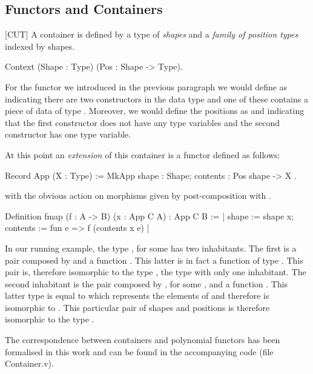 \documentclass{llncs}
\begin{document}
\subsection{Functors and Containers}
\label{sec:functors}
[CUT]
A container is defined by a type of \emph{shapes}
and a \emph{family of position types} indexed by shapes.
\begin{coqcode}
Context (Shape : Type) (Pos : Shape -> Type).
\end{coqcode}
For the functor  we introduced in the previous paragraph we would
define  as  indicating there are two constructors in
the data type and one of these contains a piece of data of type .
Moreover, we would define the positions as 
and   indicating that the first constructor does not
have any type variables and the second constructor has one type variable.

At this point an \emph{extension} of this container is a functor defined as
follows:
\begin{coqcode}
Record App (X : Type) := MkApp { shape : Shape; contents : Pos shape -> X }.
\end{coqcode}
with the obvious action on morphisms given by post-composition
with .
\begin{coqcode}
Definition fmap (f : A -> B) (x : App C A) : App C B
  := {| shape := shape x; contents := fun e => f (contents x e) |}
\end{coqcode}
In our running example, the type , for some  has two
inhabitants.  The first is a pair composed by  and a
function . This latter is in fact a function of
type . This pair is, therefore isomorphic to the
type , the type with only one inhabitant.  The second inhabitant is
the pair composed by , for some , and a
function .  This latter type is equal to 
which represents the elements of  and therefore is isomorphic to .
This particular pair of shapes and positions is  therefore isomorphic to the
type .

The correspondence between containers and polynomial functors has been
formalised in this work and can be found in the accompanying code (file
Container.v). 
% 
\end{document}
